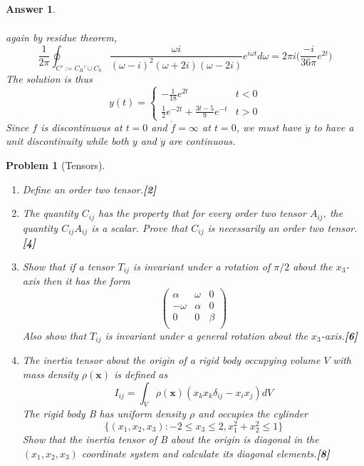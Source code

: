 \documentclass[a4paper]{article}
\newtheorem{ans}{Answer}[section]
\theoremstyle{new}
\newtheorem{qns}{Problem}[section]
\begin{document}
\begin{ans}
\begin{enumerate}[label=(\alph*)]
\begin{eqnarray}
\end{eqnarray}
again by residue theorem,
$$\frac{1}{2\pi}\oint_{C':=C_R'\cup C_0}\frac{\omega i}{(\omega-i)^2(\omega+2i)(\omega-2i)}e^{i\omega t}d\omega=2\pi i\bigg(\frac{-i}{36\pi}e^{2t}\bigg)$$
The solution is thus
  $$y(t)=
\left\{
        \begin{array}{ll}
      -\frac{1}{18}e^{2t} & t<0 \\
      \frac{1}{2}e^{-2t}+\frac{3t-5}{9}e^{-t} & t>0
        \end{array}
    \right.$$
Since $f$ is discontinuous at $t=0$ and $\dot{f}=\infty$ at $t=0$, we must have $\ddot{y}$ to have a unit discontinuity while both $y$ and $\dot{y}$ are continuous.
\begin{center}
\end{center}
\end{enumerate}
\end{ans}
\begin{qns}[Tensors]\leavevmode
\begin{enumerate}[label=(\alph*)]
\item Define an order two tensor.\hfill\textbf{[2]}
\item The quantity $C_{ij}$ has the property that for every order two tensor $A_{ij}$, the quantity $C_{ij}A_{ij}$ is a scalar. Prove that $C_{ij}$ is necessarily an order two tensor.\hfill\textbf{[4]}
\item Show that if a tensor $T_{ij}$ is invariant under a rotation of $\pi/2$ about the $x_3$-axis then it has the form
$$\begin{pmatrix}\alpha&\omega&0\\-\omega&\alpha&0\\0&0&\beta\\\end{pmatrix}$$
Also show that $T_{ij}$ is invariant under a general rotation about the $x_3$-axis.\hfill\textbf{[6]}
\item The inertia tensor about the origin of a rigid body occupying volume $V$ with mass density $\rho(\mathbf{x})$ is defined as
$$I_{ij}=\int_V\rho(\mathbf{x})(x_kx_k\delta_{ij}-x_ix_j)dV$$
The rigid body B has uniform density $\rho$ and occupies the cylinder
$$\{(x_1,x_2,x_3):-2\leq x_3\leq 2,x_1^2+x_2^2\leq 1\}$$
Show that the inertia tensor of B about the origin is diagonal in the $(x_1, x_2, x_3)$ coordinate system and calculate its diagonal elements.\hfill\textbf{[8]}
\end{enumerate}
\end{qns}
\end{document}
